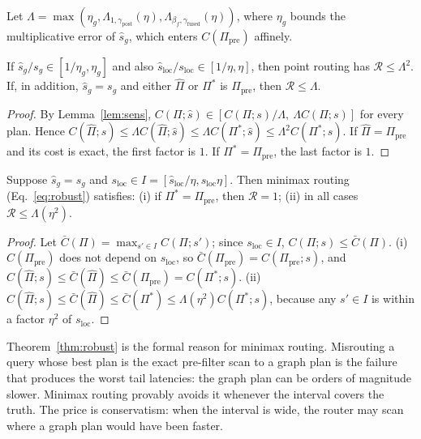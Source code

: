 \documentclass[sigconf,nonacm]{acmart}
\newcommand{\sg}{s_g}
\newcommand{\sloc}{s_{\text{loc}}}
\newcommand{\Ppre}{\Pi_{\text{pre}}}
\begin{document}
Let $\Lambda=\max(\eta_g,\Lambda_{1,\gamma_{\text{post}}}(\eta),\Lambda_{\beta_f,\gamma_{\text{fused}}}(\eta))$, where $\eta_g$ bounds the multiplicative error of $\hat s_g$, which enters $C(\Ppre)$ affinely.

\begin{theorem}\label{thm:regret}
If $\hat s_g/\sg\in[1/\eta_g,\eta_g]$ and also $\hat s_{\text{loc}}/\sloc\in[1/\eta,\eta]$, then point routing has $\mathcal{R}\le\Lambda^2$. If, in addition, $\hat s_g=\sg$ and either $\hat\Pi$ or $\Pi^*$ is $\Ppre$, then $\mathcal{R}\le\Lambda$.
\end{theorem}
\begin{proof}
By Lemma~\ref{lem:sens}, $C(\Pi;\hat s)\in[C(\Pi;s)/\Lambda,\ \Lambda C(\Pi;s)]$ for every plan. Hence $C(\hat\Pi;s)\le\Lambda C(\hat\Pi;\hat s)\le\Lambda C(\Pi^*;\hat s)\le\Lambda^2C(\Pi^*;s)$. If $\hat\Pi=\Ppre$ and its cost is exact, the first factor is $1$. If $\Pi^*=\Ppre$, the last factor is $1$.
\end{proof}

\begin{theorem}\label{thm:robust}
Suppose $\hat s_g=\sg$ and $\sloc\in I=[\hat s_{\text{loc}}/\eta,\hat s_{\text{loc}}\eta]$. Then minimax routing (Eq.~\eqref{eq:robust}) satisfies: (i) if $\Pi^*=\Ppre$, then $\mathcal{R}=1$; (ii) in all cases $\mathcal{R}\le\Lambda(\eta^2)$.
\end{theorem}
\begin{proof}
Let $\bar C(\Pi)=\max_{s'\in I}C(\Pi;s')$; since $\sloc\in I$, $C(\Pi;s)\le\bar C(\Pi)$. (i) $C(\Ppre)$ does not depend on $\sloc$, so $\bar C(\Ppre)=C(\Ppre;s)$, and $C(\hat\Pi;s)\le\bar C(\hat\Pi)\le\bar C(\Ppre)=C(\Pi^*;s)$. (ii) $C(\hat\Pi;s)\le\bar C(\hat\Pi)\le\bar C(\Pi^*)\le\Lambda(\eta^2)C(\Pi^*;s)$, because any $s'\in I$ is within a factor $\eta^2$ of $\sloc$.
\end{proof}
Theorem~\ref{thm:robust} is the formal reason for minimax routing. Misrouting a query whose best plan is the exact pre-filter scan to a graph plan is the failure that produces the worst tail latencies: the graph plan can be orders of magnitude slower. Minimax routing provably avoids it whenever the interval covers the truth. The price is conservatism: when the interval is wide, the router may scan where a graph plan would have been faster.
\end{document}
